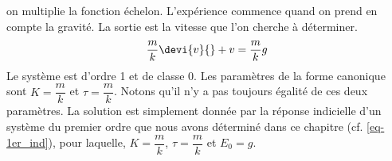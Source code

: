 on multiplie la fonction échelon. L'expérience commence quand
\og on prend en compte la gravité\fg.
La sortie est la vitesse que l'on cherche à déterminer.
\[
\dfrac{m}{k}\devi{v}{}+v=\dfrac{m}{k}g
\]
Le système est d'ordre 1 et de classe 0. Les paramètres de la forme canonique 
sont $K=\dfrac{m}{k}$ et $\tau=\dfrac{m}{k}$. Notons qu'il n'y a pas toujours 
égalité de ces deux paramètres.
La solution est simplement donnée par la réponse indicielle d'un système du 
premier ordre que nous avons déterminé dans ce chapitre (cf. \cref{eq-1er_ind}),
pour laquelle, $K=\dfrac{m}{k}$, $\tau=\dfrac{m}{k}$ et $E_0=g$.

